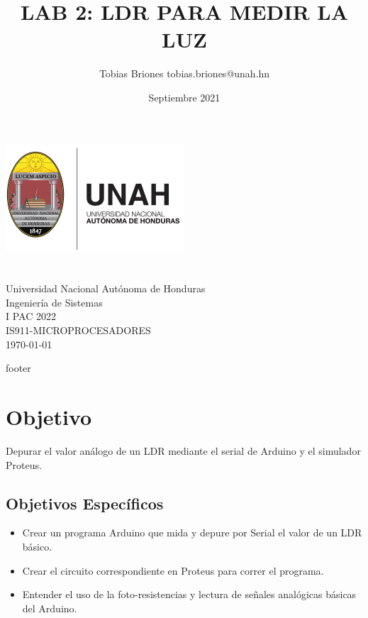 \documentclass{article}
\title{LAB 2: LDR PARA MEDIR LA LUZ}
\author{Tobias Briones \bigbreak tobias.briones@unah.hn}
\date{Septiembre 2021}
\begin{document}
    \makeatletter
    \begin{titlepage}
        \begin{center}
            \includegraphics[width=0.3\linewidth]{images/logo-unah}\\[4ex]
            {\huge \bfseries \@title
            \vspace{1cm}}\\[2ex]
            {\LARGE \@author}\\[50ex]

            {\large
            Universidad Nacional Autónoma de Honduras\\
            Ingeniería de Sistemas\\
            I PAC 2022\\
            IS911-MICROPROCESADORES
            }\\[2ex]

            {\large \today}
        \end{center}
    \end{titlepage}
    \makeatother
    \thispagestyle{empty}
    \newpage

    {footer}

    \section{Objetivo}

    Depurar el valor análogo de un LDR mediante el serial de Arduino y el
    simulador Proteus.

    \subsection{Objetivos Específicos}

    \begin{itemize}
        \item Crear un programa Arduino que mida y depure por Serial el valor
        de un LDR básico.
        \item Crear el circuito correspondiente en Proteus para correr el
        programa.
        \item Entender el uso de la foto-resistencias y lectura de señales
        analógicas básicas del Arduino.
    \end{itemize}
\end{document}
